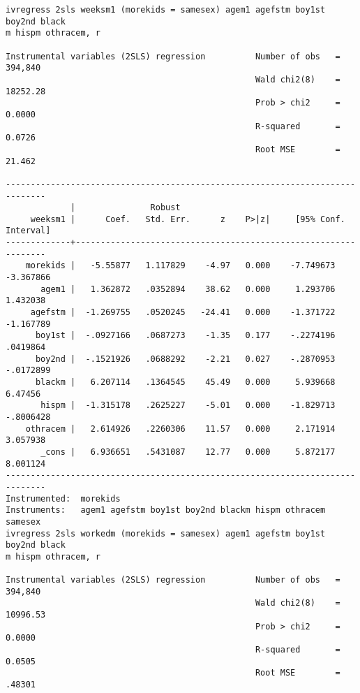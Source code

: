 \documentclass[cache=false]{article}
\begin{document}
\begin{verbatim}
ivregress 2sls weeksm1 (morekids = samesex) agem1 agefstm boy1st boy2nd black
m hispm othracem, r

Instrumental variables (2SLS) regression          Number of obs   =    394,840
                                                  Wald chi2(8)    =   18252.28
                                                  Prob > chi2     =     0.0000
                                                  R-squared       =     0.0726
                                                  Root MSE        =     21.462

------------------------------------------------------------------------------
             |               Robust
     weeksm1 |      Coef.   Std. Err.      z    P>|z|     [95% Conf. Interval]
-------------+----------------------------------------------------------------
    morekids |   -5.55877   1.117829    -4.97   0.000    -7.749673   -3.367866
       agem1 |   1.362872   .0352894    38.62   0.000     1.293706    1.432038
     agefstm |  -1.269755   .0520245   -24.41   0.000    -1.371722   -1.167789
      boy1st |  -.0927166   .0687273    -1.35   0.177    -.2274196    .0419864
      boy2nd |  -.1521926   .0688292    -2.21   0.027    -.2870953   -.0172899
      blackm |   6.207114   .1364545    45.49   0.000     5.939668     6.47456
       hispm |  -1.315178   .2625227    -5.01   0.000    -1.829713   -.8006428
    othracem |   2.614926   .2260306    11.57   0.000     2.171914    3.057938
       _cons |   6.936651   .5431087    12.77   0.000     5.872177    8.001124
------------------------------------------------------------------------------
Instrumented:  morekids
Instruments:   agem1 agefstm boy1st boy2nd blackm hispm othracem samesex
ivregress 2sls workedm (morekids = samesex) agem1 agefstm boy1st boy2nd black
m hispm othracem, r

Instrumental variables (2SLS) regression          Number of obs   =    394,840
                                                  Wald chi2(8)    =   10996.53
                                                  Prob > chi2     =     0.0000
                                                  R-squared       =     0.0505
                                                  Root MSE        =     .48301


\end{verbatim}
\end{document}
